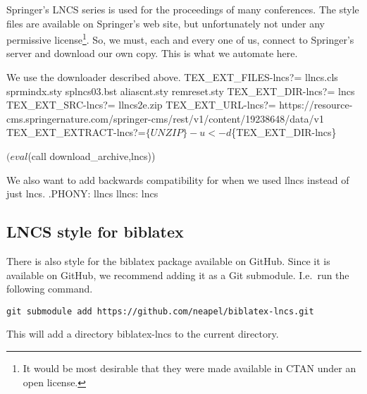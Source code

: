 Springer's \ac{LNCS} series is used for the proceedings of many 
conferences.
The style files are available on Springer's web site, but unfortunately not 
under any permissive license\footnote{%
  It would be most desirable that they were made available in \ac{CTAN} under 
  an open license.
}.
So, we must, each and every one of us, connect to Springer's server and 
download our own copy.
This is what we automate here.

We use the downloader described above.
\nwenddocs{}\endmoddef\nwstartdeflinemarkup{}\nwenddeflinemarkup
TEX_EXT_FILES-lncs?=  llncs.cls sprmindx.sty splncs03.bst aliascnt.sty remreset.sty
TEX_EXT_DIR-lncs?=    lncs
TEX_EXT_SRC-lncs?=    llncs2e.zip
TEX_EXT_URL-lncs?=    https://resource-cms.springernature.com/springer-cms/rest/v1/content/19238648/data/v1
TEX_EXT_EXTRACT-lncs?=$\{UNZIP\} -u $$< -d $\{TEX_EXT_DIR-lncs\}

$(eval $(call download_archive,lncs))
\nwendcode{}\nwdocspar

We also want to add backwards compatibility for when we used {\Tt{}llncs\nwendquote} instead 
of just {\Tt{}lncs\nwendquote}.
\nwenddocs{}\plusendmoddef\nwstartdeflinemarkup{}\nwenddeflinemarkup
.PHONY: llncs
llncs: lncs
\nwendcode{}\nwdocspar

\subsection{LNCS style for {\Tt{}biblatex\nwendquote}}

There is also  style for the {\Tt{}biblatex\nwendquote} package available on 
GitHub.
Since it is available on GitHub, we recommend adding it as a Git submodule.
I.e.\ run the following command.
\begin{lstlisting}
git submodule add https://github.com/neapel/biblatex-lncs.git
\end{lstlisting}
This will add a directory {\Tt{}biblatex-lncs\nwendquote} to the current directory.

